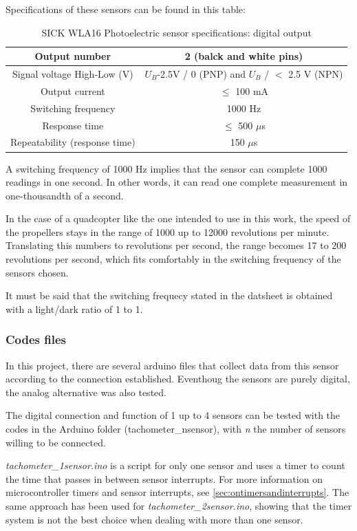 \documentclass[a4paper]{article}
\begin{document}
Specifications of these sensors can be found in this table:

\begin{table}[h!]
	\centering
	\caption{SICK WLA16 Photoelectric sensor specifications: digital output\label{tab:SICK16}}
	\begin{tabular}{||c | c ||} 
		\hline
		Output number & 2 (balck and white pins)\\ [0.5ex] 
		\hline
		Signal voltage High-Low (V) & $U_B$-2.5V / 0 (PNP) and $U_B$ / $<$ 2.5 V (NPN) \\ 
		\hline
		Output current & $\leq$ 100 mA \\
		\hline
		Switching frequency & 1000 Hz \\
		\hline
		Response time & $\leq$ 500 $\mu$s \\
		\hline
		Repeatability (response time) & 150 $\mu$s \\
		\hline
	\end{tabular}
\end{table}

A switching frequency of 1000 Hz implies that the sensor can complete 1000 readings in one second. In other words, it can read one complete measurement in one-thousandth of a second.

In the case of a quadcopter like the one intended to use in this work, the speed of the propellers stays in the range of 1000 up to 12000 revolutions per minute. Translating this numbers to revolutions per second, the range becomes 17 to 200 revolutions per second, which fits comfortably in the switching frequency of the sensors chosen.

It must be said that the switching frequecy stated in the datsheet is obtained with a light/dark ratio of 1 to 1.


\subsubsection{Codes files}
In this project, there are several arduino files that collect data from this sensor according to the connection established. Eventhoug the sensors are purely digital, the analog alternative was also tested.



The digital connection and function of 1 up to 4 sensors can be tested with the codes in the Arduino folder (tachometer\_nsensor), with \textit{n} the number of sensors willing to be connected.

\textit{tachometer\_1sensor.ino} is a script for only one sensor and uses a timer to count the time that passes in between sensor interrupts. For more information on microcontroller timers and sensor interrupts, see \autoref{sec:ontimersandinterrupts}. The same approach has been used for \textit{tachometer\_2sensor.ino}, showing that the timer system is not the best choice when dealing with more than one sensor.
\end{document}

